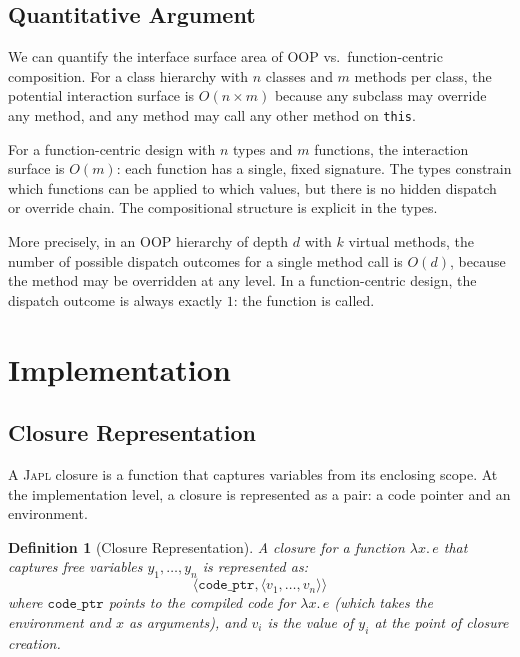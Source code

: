 \documentclass[11pt,a4paper]{article}
\newtheorem{definition}[theorem]{Definition}
\newcommand{\japl}{\textsc{Japl}}
\begin{document}
\subsection{Quantitative Argument}

We can quantify the interface surface area of OOP vs.\ function-centric composition. For a class hierarchy with $n$ classes and $m$ methods per class, the potential interaction surface is $O(n \times m)$ because any subclass may override any method, and any method may call any other method on \texttt{this}.

For a function-centric design with $n$ types and $m$ functions, the interaction surface is $O(m)$: each function has a single, fixed signature. The types constrain which functions can be applied to which values, but there is no hidden dispatch or override chain. The compositional structure is explicit in the types.

More precisely, in an OOP hierarchy of depth $d$ with $k$ virtual methods, the number of possible dispatch outcomes for a single method call is $O(d)$, because the method may be overridden at any level. In a function-centric design, the dispatch outcome is always exactly $1$: the function is called.


\section{Implementation}
\label{sec:implementation}

\subsection{Closure Representation}

A \japl{} closure is a function that captures variables from its enclosing scope. At the implementation level, a closure is represented as a pair: a code pointer and an environment.

\begin{definition}[Closure Representation]
A closure for a function $\lambda x.\, e$ that captures free variables $y_1, \ldots, y_n$ is represented as:
\[
\langle \texttt{code\_ptr}, \langle v_1, \ldots, v_n \rangle \rangle
\]
where $\texttt{code\_ptr}$ points to the compiled code for $\lambda x.\, e$ (which takes the environment and $x$ as arguments), and $v_i$ is the value of $y_i$ at the point of closure creation.
\end{definition}
\end{document}
